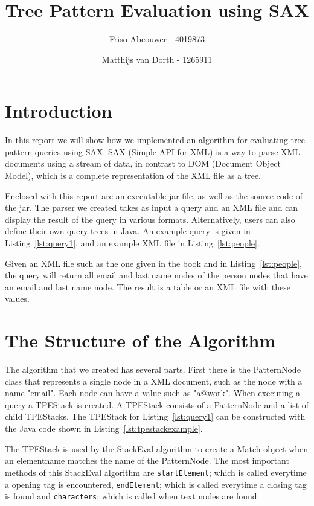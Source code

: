 \documentclass[11pt]{article}
\title{Tree Pattern Evaluation using SAX}
\author{Friso Abcouwer - 4019873 \and Matthijs van Dorth - 1265911}
\begin{document}
\maketitle

\section{Introduction}
In this report we will show how we implemented an algorithm for evaluating tree-pattern queries using SAX. SAX (Simple API for XML) is a way to parse XML documents using a stream of data, in contrast to DOM (Document Object Model), which is a complete representation of the XML file as a tree.

Enclosed with this report are an executable jar file, as well as the source code of the jar.
The parser we created takes as input a query and an XML file and can display the result of the query in various formats. Alternatively, users can also define their own query trees in Java.  An example query is given in Listing~\ref{lst:query1}, and an example XML file in Listing~\ref{lst:people}.


Given an XML file such as the one given in the book and in Listing~\ref{lst:people}, the query will return all email and last name nodes of the person nodes that have an email and last name node.
The result is a table or an XML file with these values.

\section{The Structure of the Algorithm}
The algorithm that we created has several parts. First there is the PatternNode class that represents a single node in a XML document, such as the node with a name "email". Each node can have a value such as "a@work".
When executing a query a TPEStack is created. A TPEStack consists of a PatternNode and a list of child TPEStacks. The TPEStack for Listing~\ref{lst:query1} can be constructed with the Java code shown in Listing~\ref{lst:tpestackexample}. 


The TPEStack is used by the StackEval algorithm to create a Match object when an elementname matches the
name of the PatternNode. The most important methods of this StackEval algorithm are \lstinline{startElement}; which is called everytime a opening tag is encountered, \lstinline{endElement}; which is called everytime a closing tag is found and \lstinline{characters}; which is called when text nodes are found. 
\end{document}

